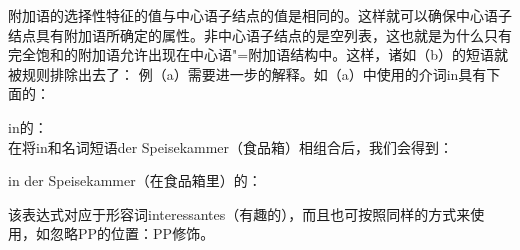 附加语的选择性特征的值与中心语子结点的\synsemc 值是相同的。这样就可以确保中心语子结点具有附加语所确定的属性。非中心语子结点的\subcatvc 是空列表，这也就是为什么只有完全饱和的附加语允许出现在中心语"=附加语结构中。这样，诸如（b）的短语就被规则排除出去了：
\eal
{}
\zl
例（a）需要进一步的解释。如（a）中使用的介词in具有下面的\catvc：

\ea
in的\catvc：\\
\z
在将in和名词短语der Speisekammer（食品箱）相组合后，我们会得到：

\eas
in der Speisekammer（在食品箱里）的\catvc：\\
\zs

\noindent
该表达式对应于形容词interessantes（有趣的），而且也可按照同样的方式来使用，如忽略PP的位置：PP修饰\nbarc。

